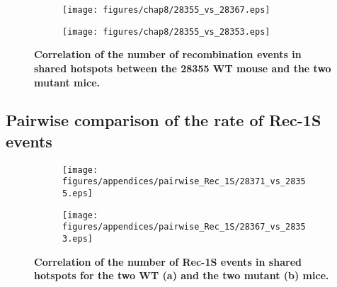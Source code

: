 \begin{figure}[h!]
    \centering
   
	\begin{subfigure}[b]{0.75\textwidth}
        \texttt{[image: figures/chap8/28355\_vs\_28367.eps]}
    \end{subfigure}

    \vspace{0.5cm}
    
	\begin{subfigure}[b]{0.75\textwidth}
        \texttt{[image: figures/chap8/28355\_vs\_28353.eps]}
    \end{subfigure}


    \caption[Correlation of the number of recombination events in shared hotspots between the 28355 WT mouse and the two mutant mice]
    {\textbf{Correlation of the number of recombination events in shared hotspots between the 28355 WT mouse and the two mutant mice.}
    }
\label{fig:pairwise-RR-shared-BIS2}
\end{figure}



\newpage
\subsection{Pairwise comparison of the rate of Rec-1S events}



\begin{figure}[h!]
    \centering
    \begin{subfigure}[b]{0.75\textwidth}
        \texttt{[image: figures/appendices/pairwise\_Rec\_1S/28371\_vs\_28355.eps]}
    \end{subfigure}

    \vspace{0.5cm}

    \begin{subfigure}[b]{0.75\textwidth}
        \texttt{[image: figures/appendices/pairwise\_Rec\_1S/28367\_vs\_28353.eps]}
    \end{subfigure}

	\caption[Correlation of the number of Rec-1S events in shared hotspots for the two WT and the two mutant mice]
	{\textbf{Correlation of the number of Rec-1S events in shared hotspots for the two WT (a) and the two mutant (b) mice.}
    }
\label{fig:pairwise-RR-shared-Rec1S-2}
\end{figure}



